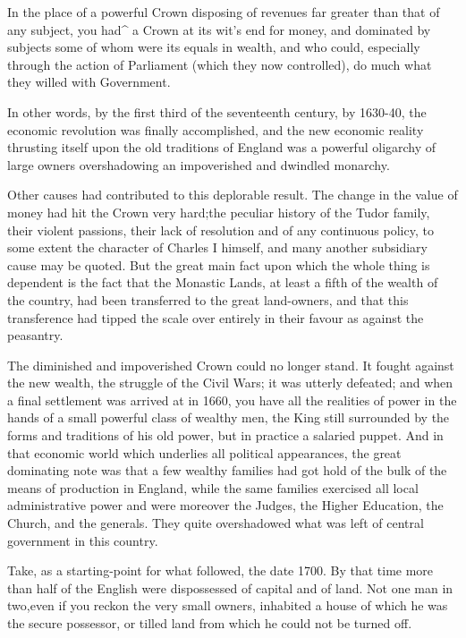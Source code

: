 \documentclass{book}
\begin{document}
In the place of a powerful Crown disposing of revenues far greater than that of any subject, you had\textasciicircum{} a Crown at its wit’s end for money, and dominated by subjects some of whom were its equals in wealth, and who could, especially through the action of Parliament (which they now controlled), do much what they willed with Government.

In other words, by the first third of the seventeenth century, by 1630-40, the economic revolution was finally accomplished, and the new economic reality thrusting itself upon the old traditions of England was a powerful oligarchy of large owners overshadowing an impoverished and dwindled monarchy.

Other causes had contributed to this deplorable result. The change in the value of money had hit the Crown very hard;\footnotemark[1] the peculiar history of the Tudor family, their violent passions, their lack of resolution and of any continuous policy, to some extent the character of Charles I himself, and many another subsidiary cause may be quoted. But the great main fact upon which the whole thing is dependent is the fact that the Monastic Lands, at least a fifth of the wealth of the country, had been transferred to the great land-owners, and that this transference had tipped the scale over entirely in their favour as against the peasantry.

The diminished and impoverished Crown could no longer stand. It fought against the new wealth, the struggle of the Civil Wars; it was utterly defeated; and when a final settlement was arrived at in 1660, you have all the realities of power in the hands of a small powerful class of wealthy men, the King still surrounded by the forms and traditions of his old power, but in practice a salaried puppet. And in that economic world which underlies all political appearances, the great dominating note was that a few wealthy families had got hold of the bulk of the means of production in England, while the same families exercised all local administrative power and were moreover the Judges, the Higher Education, the Church, and the generals. They quite overshadowed what was left of central government in this country.

Take, as a starting-point for what followed, the date 1700. By that time more than half of the English were dispossessed of capital and of land. Not one man in two,even if you reckon the very small owners, inhabited a house of which he was the secure possessor, or tilled land from which he could not be turned off.
\end{document}
